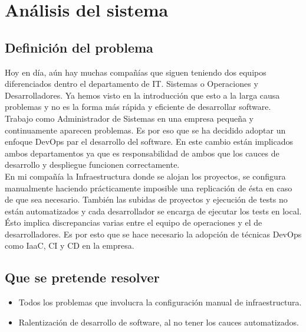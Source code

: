 \chapter {Análisis del sistema}

\section{Definición del problema}
\begin{paragraph}
	Hoy en día, aún hay muchas compañías que siguen teniendo dos equipos diferenciados dentro el departamento de IT. Sistemas o Operaciones y Desarrolladores. Ya hemos visto en la introducción que esto a la larga causa problemas y no es la forma más rápida y eficiente de desarrollar software. \\
	Trabajo como Administrador de Sistemas en una empresa pequeña y continuamente aparecen problemas. Es por eso que se ha decidido adoptar un enfoque DevOps par el desarrollo del software. En este cambio están implicados ambos departamentos ya que es responsabilidad de ambos que los cauces de desarrollo y despliegue funcionen correctamente. \\
	En mi compañía la Infraestructura donde se alojan los proyectos, se configura manualmente haciendo prácticamente imposible una replicación de ésta en caso de que sea necesario. También las subidas de proyectos y ejecución de tests no están automatizados y cada desarrollador se encarga de ejecutar los tests en local. Ésto implica discrepancias varias entre el equipo de operaciones y el de desarrolladores. Es por esto que se hace necesario la adopción de técnicas DevOps como IaaC, CI y CD en la empresa.
\end{paragraph}
\section{Que se pretende resolver}
		\begin{itemize}
			\item Todos los problemas que involucra la configuración manual de infraestructura.
			\item Ralentización de desarrollo de software, al no tener los cauces automatizados.
		\end{itemize}

